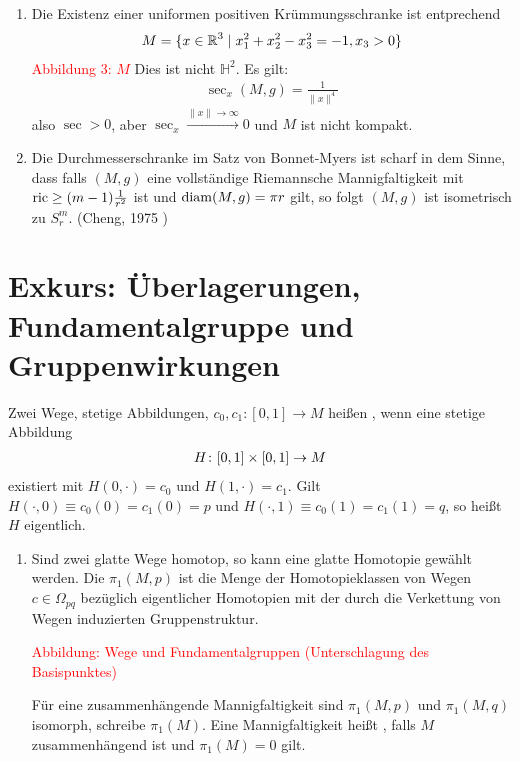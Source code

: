 \begin{bem}
  \begin{enumerate}[label=(\arabic*),leftmargin=*]
  \item Die Existenz einer uniformen positiven Krümmungsschranke ist entprechend
    \begin{align*}
      M = \{x \in \operatorname{\mathbb{R}}^3 \mid x_1^2 + x_2^2 - x_3^2 = -1, x_3 > 0\}
    \end{align*}
    \textcolor{red}{Abbildung 3: $M$}
    Dies ist nicht $\mathbb H^2$.
    Es gilt:
    \begin{align*}
      \sec_x(M,g) = \frac{1}{\|x\|^4}
    \end{align*}
    also $\sec > 0$, aber $\sec_x \xrightarrow{\|x\|\to\infty}0$ und $M$ ist nicht kompakt.
  \item Die Durchmesserschranke im Satz von Bonnet-Myers ist scharf in dem Sinne, dass falls $(M,g)$ eine vollständige Riemannsche Mannigfaltigkeit mit $\operatorname{ric} \geq (m-1)\frac{1}{r^2}$ ist und $\operatorname{diam}(M,g) = \pi r$ gilt, so folgt $(M,g)$ ist isometrisch zu $S^m_r$. (Cheng, 1975 \cite{Cheng1975})
  \end{enumerate}
\end{bem}

\section{Exkurs: Überlagerungen, Fundamentalgruppe und Gruppenwirkungen}

\begin{emptythm}[Erinnerung]
  Zwei Wege, stetige Abbildungen, $c_0,c_1 \colon[0,1] \to M$ heißen , wenn eine stetige Abbildung
  \begin{align*}
    H \colon [0,1]\times[0,1] \to M
  \end{align*}
  existiert mit $H(0,\cdot) = c_0$ und $H(1,\cdot) = c_1$.
  Gilt $H(\cdot, 0) \equiv c_0(0) = c_1(0) = p$ und $H(\cdot,1) \equiv c_0(1) = c_1(1) = q$, so heißt $H$ eigentlich.
\end{emptythm}

\begin{bem}
  \begin{enumerate}[label=(\arabic*)]
  \item Sind zwei glatte Wege homotop, so kann eine glatte Homotopie gewählt werden.
    Die  $\pi_1(M,p)$ ist die Menge der Homotopieklassen von Wegen $c \in \Omega_{pq}$ bezüglich eigentlicher Homotopien mit der durch die Verkettung von Wegen induzierten Gruppenstruktur.
    \begin{center}
      \textcolor{red}{Abbildung: Wege und Fundamentalgruppen (Unterschlagung des Basispunktes)}
    \end{center}
    Für eine zusammenhängende Mannigfaltigkeit sind $\pi_1(M,p)$ und $\pi_1(M,q)$ isomorph, schreibe $\pi_1(M)$.
    Eine Mannigfaltigkeit heißt , falls $M$ zusammenhängend ist und $\pi_1(M) = 0$ gilt.
  \end{enumerate}
\end{bem}

